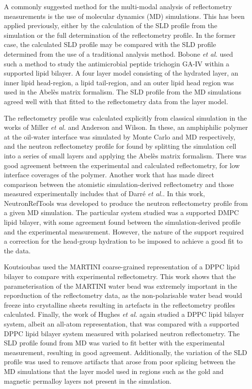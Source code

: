 \documentclass[twoside,twocolumn,9pt]{article}
\begin{document}
A commonly suggested method for the multi-modal analysis of reflectometry measurements is the use of molecular dynamics (MD) simulations.
This has been applied previously, either by the calculation of the SLD profile from the simulation or the full determination of the reflectometry profile.
In the former case, the calculated SLD profile may be compared with the SLD profile determined from the use of a traditional analysis method.
Bobone \emph{et al.} used such a method to study the antimicrobial peptide trichogin GA-IV within a supported lipid bilayer.\cite{Bobone2013}
A four layer model consisting of the hydrated  layer, an inner lipid head-region, a lipid tail-region, and an outer lipid head region was used in the Abel\`{e}s matrix formalism.
The SLD profile from the MD simulations agreed well with that fitted to the reflectometry data from the layer model.

The reflectometry profile was calculated explicitly from classical simulation in the works of Miller \emph{et al.} and Anderson and Wilson.\cite{Miller2003,Anderson2004}
In these, an amphiphilic polymer at the oil-water interface was simulated by Monte Carlo and MD respectively, and the neutron reflectometry profile for found by splitting the simulation cell into a series of small layers and applying the Abel\`{e}s matrix formalism.
There was good agreement between the experimental and calculated reflectometry, for low interface coverages of the polymer.
Another work that has made direct comparison between the atomistic simulation-derived reflectometry and those measured experimentally includes that of Darr\'{e} \emph{et al.}.\cite{Darre2015}
In this work, NeutronRefTools was developed to produce the neutron reflectometry profile from a given MD simulation.
The particular system studied was a supported DMPC lipid bilayer, with some agreement found between the simulation-derived profile and the experimental measurement.
However, the nature of the support required a correction for the head-group hydration to be imposed to achieve a good fit to the data.

Koutsioubas used the MARTINI coarse-grained representation of a DPPC lipid bilayer to compare with experimental reflectometry.\cite{Koutsioubas2016}
This work shows that the parameterisation of the MARTINI water bead was extremely important in the reporduction of the reflectometry data, as the non-polarisable water bead would freeze into crystalline sheets resulting in artefacts in the reflectometry profiles calculated.
Finally, the work of Hughes \emph{et al.} again studied a DPPC lipid bilayer system,\cite{Hughes2016} albeit an all-atom representation, that was compared with a supported DPPC lipid bilayer system measured with polarised neutron reflectometry.
The SLD profile found from MD was varied to fit better with the experimental measurement, resulting in good agreement.
Additionally, the variation of the SLD profile was used to remove artifacts that arose from poor splicing between the MD simulations that the layer model used in regions such as the gold and magnetic permalloy layers not present in the simulation.
\end{document}
